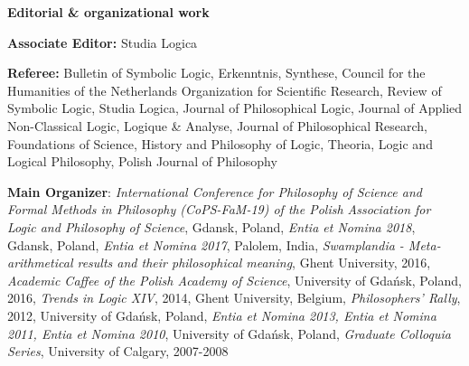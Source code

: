 \documentclass[10pt, a4paper]{article}
\begin{document}
\vspace{0.5mm}



\vspace{2mm}

\large {\sc \textbf{Editorial \& organizational work}}\normalsize \hspace{5mm} 


\normalsize


\textbf{Associate Editor:} Studia Logica

\textbf{Referee:} Bulletin of Symbolic Logic, Erkenntnis,  Synthese, Council for the Humanities of the Netherlands Organization for Scientific Research, Review of Symbolic Logic,  Studia Logica,  Journal of Philosophical Logic, Journal of Applied Non-Classical Logic,  Logique \& Analyse,   Journal of Philosophical Research,  Foundations of Science,  History and Philosophy of Logic, Theoria, Logic and Logical Philosophy, Polish Journal of Philosophy



\textbf{Main Organizer}: \emph{International Conference for Philosophy of Science and Formal Methods in Philosophy (CoPS-FaM-19) of the Polish Association for Logic and Philosophy of Science}, Gdansk, Poland, \emph{Entia et Nomina 2018}, Gdansk, Poland,  \emph{Entia et Nomina 2017}, Palolem, India, \emph{Swamplandia - Meta-arithmetical results and their philosophical meaning}, Ghent University, 2016, \emph{Academic Caffee of the Polish Academy of Science}, University of Gda{\'n}sk, Poland, 2016, \emph{Trends in Logic XIV}, 2014, Ghent University, Belgium, \emph{Philosophers' Rally}, 2012, University of Gda\' nsk, Poland, \emph{Entia et Nomina 2013, Entia et Nomina 2011, Entia et Nomina 2010}, University of Gda{\'n}sk, Poland,  \emph{Graduate Colloquia Series}, University of Calgary, 2007-2008







%
\end{document}
